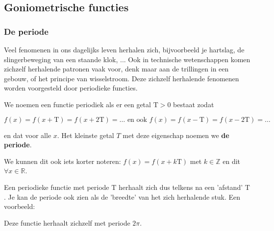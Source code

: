 


\subsection{Goniometrische functies}

\subsubsection{De periode}

Veel fenomenen in ons dagelijks leven herhalen zich, bijvoorbeeld
je hartslag, de slingerbeweging van een staande klok, ... Ook in technische
wetenschappen komen zichzelf herhalende patronen vaak voor, denk maar
aan de trillingen in een gebouw, of het principe van wisselstroom.
Deze zichzelf herhalende fenomenen worden voorgesteld door periodieke
functies.


We noemen een functie periodiek als er een getal $\textrm{T}>0$
bestaat zodat

\begin{equation*}
f(x)=f(x+\textrm{T})=f(x+2\textrm{T})=\ldots \text{ en ook } f(x)=f(x-\textrm{T})=f(x-2\textrm{T})=\ldots
\end{equation*}

en dat voor alle $x$. Het kleinste getal $T$ met deze eigenschap
noemen we \textbf{de periode}.

We kunnen dit ook iets korter noteren: $f(x)=f(x+k\textrm{T})$
met $k\in\mathbb{Z}$ en dit $\forall x\in\mathbb{R}$.


Een periodieke functie met periode $\textrm{T}$ herhaalt zich dus
telkens na een \textquoteright afstand\textquoteright{} $\textrm{T}$.
Je kan de periode ook zien als de \textquoteright breedte\textquoteright{}
van het zich herhalende stuk. Een voorbeeld:




Deze functie herhaalt zichzelf met periode $2\pi$.

